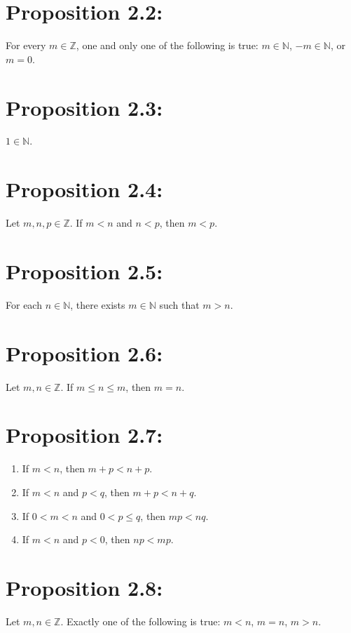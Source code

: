 \section*{Proposition 2.2:}
For every $m \in \mathbb{Z}$, one and only one of the following is true: $m \in \mathbb{N}$, $-m \in \mathbb{N}$, or $m = 0$.

\section*{Proposition 2.3:}
$1 \in \mathbb{N}$.

\section*{Proposition 2.4:}
Let $m,n,p \in \mathbb{Z}$. If $m < n$ and $n < p$, then $m < p$.

\section*{Proposition 2.5:}
For each $n \in \mathbb{N}$, there exists $m \in \mathbb{N}$ such that $m > n$.

\section*{Proposition 2.6:}
Let $m,n \in \mathbb{Z}$. If $m \leq n \leq m$, then $m = n$.

\section*{Proposition 2.7:}
\begin{enumerate}[label=(\roman*)]
    \item If $m < n$, then $m+p < n+p$.
    \item If $m < n$ and $p < q$, then $m+p < n+q$.
    \item If $0 < m < n$ and $0 < p \leq q$, then $mp < nq$.
    \item If $m < n$ and $p < 0$, then $np < mp$.
\end{enumerate}

\section*{Proposition 2.8:}
Let $m,n \in \mathbb{Z}$. Exactly one of the following is true: $m < n$, $m = n$, $m > n$.

